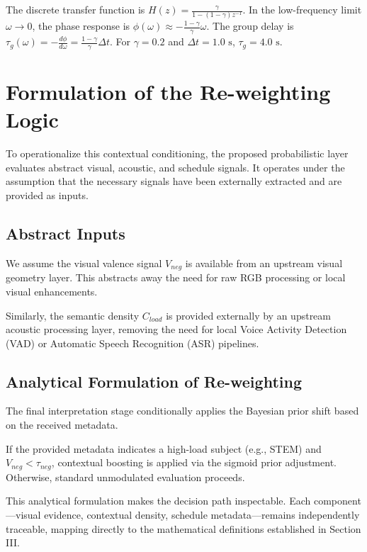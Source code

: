 \documentclass[conference]{IEEEtran}
\begin{document}
\begin{IEEEproof}
The discrete transfer function is $H(z) = \frac{\gamma}{1 - (1-\gamma)z^{-1}}$. In the low-frequency limit $\omega \to 0$, the phase response is $\phi(\omega) \approx -\frac{1-\gamma}{\gamma} \omega$. The group delay is $\tau_g(\omega) = -\frac{d\phi}{d\omega} = \frac{1-\gamma}{\gamma} \Delta t$. For $\gamma = 0.2$ and $\Delta t = 1.0\text{ s}$, $\tau_g = 4.0\text{ s}$.
\end{IEEEproof}

\section{Formulation of the Re-weighting Logic}
To operationalize this contextual conditioning, the proposed probabilistic layer evaluates abstract visual, acoustic, and schedule signals. It operates under the assumption that the necessary signals have been externally extracted and are provided as inputs.

\subsection{Abstract Inputs}
We assume the visual valence signal $V_{neg}$ is available from an upstream visual geometry layer. This abstracts away the need for raw RGB processing or local visual enhancements. 

Similarly, the semantic density $C_{load}$ is provided externally by an upstream acoustic processing layer, removing the need for local Voice Activity Detection (VAD) or Automatic Speech Recognition (ASR) pipelines.

\subsection{Analytical Formulation of Re-weighting}
The final interpretation stage conditionally applies the Bayesian prior shift based on the received metadata.

If the provided metadata indicates a high-load subject (e.g., STEM) and $V_{neg} < \tau_{neg}$, contextual boosting is applied via the sigmoid prior adjustment. Otherwise, standard unmodulated evaluation proceeds.

This analytical formulation makes the decision path inspectable. Each component—visual evidence, contextual density, schedule metadata—remains independently traceable, mapping directly to the mathematical definitions established in Section III.
\end{document}
